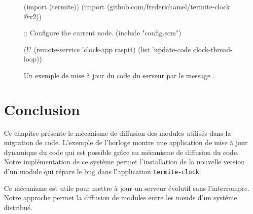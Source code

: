 \begin{figure}[h!]
\begin{center}
\begin{mplisting}{1}
(import (termite))
(import (github.com/frederichamel/termite-clock @v2))

;; Configure the current node.
(include "config.scm")

(!? (remote-service 'clock-app raspi4)
    (list 'update-code clock-thread-loop))
\end{mplisting}
\end{center}
  \caption{Un exemple de mise à jour du code du serveur
    par le message .}
  \vspace*{4ex}
\end{figure}

\section{Conclusion}
Ce chapitre présente le mécanisme de diffusion des modules utilisés
dans la migration de code. L'exemple de l'horloge montre une application
de mise à jour dynamique du code qui est possible grâce au mécanisme
de diffusion du code. Notre implémentation de ce système permet l'installation
de la nouvelle version d'un module qui répare le bug dans l'application
\texttt{termite-clock}.

Ce mécanisme est utile pour mettre à jour un serveur évolutif
sans l'interrompre. Notre approche permet la diffusion de modules
entre les nœuds d'un système distribué.

